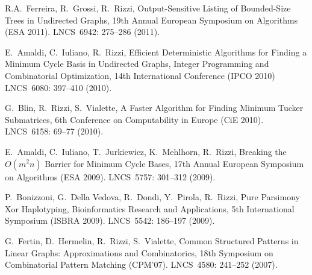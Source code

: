 \begin{etaremune}
\vspace{-1.8mm}
  \item {R.A.~Ferreira, R.~Grossi, R.~Rizzi},
   \newblock Output-Sensitive Listing of Bounded-Size Trees in Undirected Graphs,
   \newblock 19th Annual European Symposium on Algorithms (ESA 2011).
   \newblock LNCS~6942: 275--286 (2011).

\vspace{-1.8mm}
  \item {E.~Amaldi, C.~Iuliano, R.~Rizzi},
   \newblock Efficient Deterministic Algorithms for Finding a Minimum Cycle Basis in Undirected Graphs,
   \newblock Integer Programming and Combinatorial Optimization, 14th International Conference (IPCO 2010)
   \newblock LNCS~6080: 397--410 (2010).
%

\vspace{-1.8mm}
  \item {G.~Blin, R.~Rizzi, S.~Vialette},
   \newblock A Faster Algorithm for Finding Minimum Tucker Submatrices,
   \newblock 6th Conference on Computability in Europe (CiE 2010).
   \newblock LNCS~6158: 69--77 (2010).

\vspace{-1.8mm}
  \item {E.~Amaldi, C.~Iuliano, T.~Jurkiewicz, K.~Mehlhorn, R.~Rizzi},
   \newblock Breaking the $O(m^2n)$ Barrier for Minimum Cycle Bases,
   \newblock 17th Annual European Symposium on Algorithms (ESA 2009).
   \newblock LNCS~5757: 301--312 (2009).

\vspace{-1.8mm}
  \item {P.~Bonizzoni, G.~Della Vedova, R.~Dondi, Y.~Pirola, R.~Rizzi},
   \newblock Pure Parsimony Xor Haplotyping,
   \newblock Bioinformatics Research and Applications, 5th International Symposium (ISBRA 2009).
   \newblock LNCS~5542: 186--197 (2009).

\vspace{-1.8mm}
  \item {G.~Fertin, D.~Hermelin, R.~Rizzi, S.~Vialette},
   \newblock Common Structured Patterns in Linear Graphs: Approximations and Combinatorics,
   \newblock 18th Symposium on Combinatorial Pattern Matching (CPM'07).
   \newblock LNCS~4580: 241--252 (2007).


\end{etaremune}
